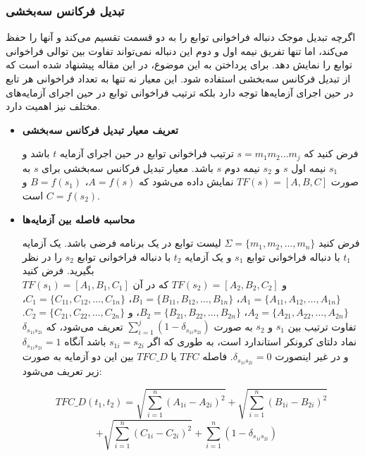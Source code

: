 \subsubsection{تبدیل فرکانس سه‌بخشی}
اگرچه تبدیل موجک دنباله فراخوانی توابع را به دو قسمت تقسیم می‌کند و آنها را حفظ می‌کند، اما تنها تفریق نیمه اول و دوم این دنباله نمی‌تواند تفاوت بین توالی فراخوانی توابع را نمایش دهد. برای پرداختن به این موضوع، در این مقاله پیشنهاد شده است که از تبدیل فرکانس سه‌بخشی  استفاده شود. این معیار نه تنها به تعداد فراخوانی هر تابع در حین اجرای آزمایه‌ها توجه دارد بلکه ترتیب فراخوانی توابع در حین اجرای آزمایه‌های مختلف نیز اهمیت دارد.

\begin{itemize}
\newpage
\item \textbf{تعریف معیار تبدیل فرکانس سه‌بخشی}

فرض کنید که \(s = m_1 m_2 \dots m_j\) ترتیب فراخوانی توابع در حین اجرای آزمایه \(t\) باشد و \(s_1\) نیمه اول \(s\) و \(s_2\) نیمه دوم \(s\) باشد. معیار تبدیل فرکانس سه‌بخشی برای \(s\) به صورت \(TF(s) = [A, B, C]\) نمایش داده می‌شود که \(A = f(s)\)، \(B = f(s_1)\) و \(C = f(s_2)\) است.

\item \textbf{محاسبه فاصله بین آزمایه‌‌ها}

فرض کنید \(\Sigma = \{m_1, m_2, \dots, m_n\}\) لیست توابع در یک برنامه فرضی باشد. یک آزمایه \(t_1\) با دنباله فراخوانی توابع \(s_1\) و یک آزمایه \(t_2\) با دنباله فراخوانی توابع \(s_2\) را در نظر بگیرید. فرض کنید\\ \(TF(s_1) = [A_1, B_1, C_1]\) و \(TF(s_2) = [A_2, B_2, C_2]\) که در آن \(A_1 = \{A_{11}, A_{12}, \dots, A_{1n}\}\)، \(B_1 = \{B_{11}, B_{12}, \dots, B_{1n}\}\)، \(C_1 = \{C_{11}, C_{12}, \dots, C_{1n}\}\)، \(A_2 = \{A_{21}, A_{22}, \dots, A_{2n}\}\)، \(B_2 = \{B_{21}, B_{22}, \dots, B_{2n}\}\)، و \(C_2 = \{C_{21}, C_{22}, \dots, C_{2n}\}\). تفاوت ترتیب بین \(s_1\) و \(s_2\) به صورت \(\sum_{i=1}^{j} \left(1 - \delta_{s_{1i} s_{2i}}\right)\) تعریف می‌شود، که \(\delta_{s_{1i} s_{2i}}\) نماد دلتای کرونکر استاندارد است، به طوری که اگر \(s_{1i} = s_{2i}\) باشد آنگاه \(\delta_{s_{1i} s_{2i}} = 1\) و در غیر اینصورت \(\delta_{s_{1i} s_{2i}} = 0\). فاصله \(TFC\)  یا \(TFC\_D\) بین این دو آزمایه به صورت زیر تعریف می‌شود:

\[
TFC\_D(t_1, t_2) = \sqrt{\sum_{i=1}^{n} (A_{1i} - A_{2i})^2} + \sqrt{\sum_{i=1}^{n} (B_{1i} - B_{2i})^2}
\]
\[
+ \sqrt{\sum_{i=1}^{n} (C_{1i} - C_{2i})^2} + \sum_{i=1}^{n} \left(1 - \delta_{s_{1i} s_{2i}}\right)
\quad
\]

\end{itemize}

